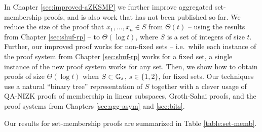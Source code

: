 In Chapter \ref{sec:improved-aZKSMP} we further improve aggregated set-membership proofs, and is also work that has not been published so far. We reduce the size of the proof that $x_1,\ldots,x_n\in S$ from $\Theta(t)$ -- using the results from Chapter \ref{sec:shuf-rp} -- to $\Theta(\log t)$, where $S$ is a set of integers of size $t$. Further, our improved proof works for non-fixed sets -- i.e.~while each instance of the proof system from Chapter \ref{sec:shuf-rp} works for a fixed set, a single instance of the new proof system works for any set. Then, we show how to obtain proofs of size $\Theta(\log t)$ when $S\subset\mathbb{G}_s$, $s\in\{1,2\}$, for fixed sets. Our techniques use a natural ``binary tree'' representation of $S$ together with a clever usage of QA-NIZK proofs of membership in linear subspaces, Groth-Sahai proofs, and the proof systems from Chapters \ref{sec:agg-asym} and \ref{sec:bits}.
  

Our results for set-membership proofs are summarized in Table \ref{table:set-memb}.


